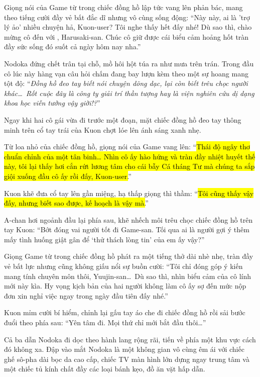 \documentclass[../main.tex]{subfiles}
\begin{document}
Giọng nói của Game từ trong chiếc đồng hồ lập tức vang lên phản bác, mang theo tiếng cười đầy vẻ bất đắc dĩ nhưng vô cùng sống động: ``Này này, ai là 'trợ lý ảo' nhiều chuyện hả, Kuon-user? Tôi nghe thấy hết đấy nhé! Dù sao thì, chào mừng cô đến với \hll, Harusaki-san. Chúc cô giữ được cái biểu cảm hoảng hốt tràn đầy sức sống đó suốt cả ngày hôm nay nha.''

Nodoka đứng chết trân tại chỗ, mồ hôi hột túa ra như mưa trên trán. Trong đầu cô lúc này hàng vạn câu hỏi chấm đang bay lượn kèm theo một sự hoang mang tột độ: ``\textit{Đồng hồ đeo tay biết nói chuyện dõng dạc, lại còn biết trêu chọc người khác\dots\ Rốt cuộc đây là công ty giải trí thần tượng hay là viện nghiên cứu dị dạng khoa học viễn tưởng vậy giời!?}''

Ngay khi hai cô gái vừa đi trước một đoạn, mặt chiếc đồng hồ đeo tay thông minh trên cổ tay trái của Kuon chợt lóe lên ánh sáng xanh nhẹ.

Từ loa nhỏ của chiếc đồng hồ, giọng nói của Game vang lên: ``\hl{Thái độ ngây thơ chuẩn chỉnh của một tân binh\dots{} Nhìn cô ấy hào hứng và tràn đầy nhiệt huyết thế này, tôi lại thấy hơi cắn rứt lương tâm cho cái bẫy Cá tháng Tư mà chúng ta sắp giội xuống đầu cô ấy rồi đấy, Kuon-user.}''

Kuon khẽ đưa cổ tay lên gần miệng, hạ thấp giọng thì thầm: ``\hl{Tôi cũng thấy vậy đấy, nhưng biết sao được, kế hoạch là vậy mà.}''

A-chan hơi ngoảnh đầu lại phía sau, khẽ nhếch môi trêu chọc chiếc đồng hồ trên tay Kuon: ``Bớt đóng vai người tốt đi Game-san. Tối qua ai là người gợi ý thêm mấy tình huống giật gân để `thử thách lòng tin' của em ấy vậy?''

Giọng Game từ trong chiếc đồng hồ phát ra một tiếng thở dài nhè nhẹ, tràn đầy vẻ bất lực nhưng cũng không giấu nổi sự buồn cười: ``Tôi chỉ đóng góp ý kiến mang tính chuyên môn thôi, Yuujin-san\dots\ Dù sao thì, nhìn biểu cảm của cô lính mới này kìa. Hy vọng kịch bản của hai người không làm cô ấy sợ đến mức nộp đơn xin nghỉ việc ngay trong ngày đầu tiên đấy nhé.''

Kuon mỉm cười bí hiểm, chỉnh lại gấu tay áo che đi chiếc đồng hồ rồi sải bước đuổi theo phía sau: ``Yên tâm đi. Mọi thứ chỉ mới bắt đầu thôi\dots''

\ct

Cả ba dẫn Nodoka đi dọc theo hành lang rộng rãi, tiến về phía một khu vực cách đó không xa. Đập vào mắt Nodoka là một không gian vô cùng êm ái với chiếc ghế sô-pha dài bọc da cao cấp, chiếc TV màn hình lớn dựng ngay trung tâm và một chiếc tủ kính chất đầy các loại bánh kẹo, đồ ăn vặt hấp dẫn.
\end{document}
